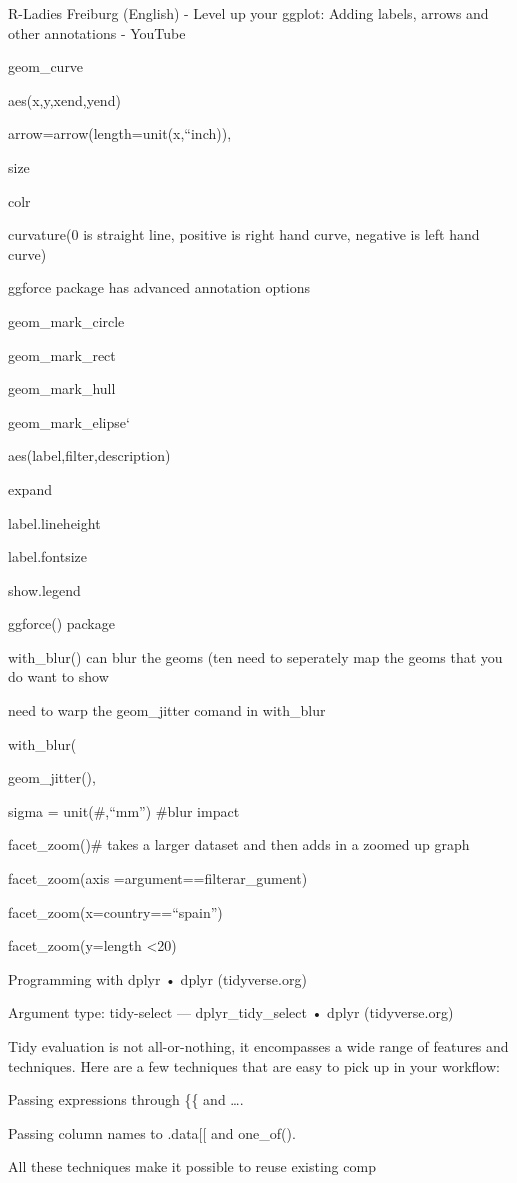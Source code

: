 \documentclass[
  letterpaper,
  DIV=11,
  numbers=noendperiod]{scrreprt}
\begin{document}
R-Ladies Freiburg (English) - Level up your ggplot: Adding labels,
arrows and other annotations - YouTube

geom\_curve

aes(x,y,xend,yend)

arrow=arrow(length=unit(x,``inch)),

size

colr

curvature(0 is straight line, positive is right hand curve, negative is
left hand curve)

ggforce package has advanced annotation options

geom\_mark\_circle

geom\_mark\_rect

geom\_mark\_hull

geom\_mark\_elipse`

aes(label,filter,description)

expand

label.lineheight

label.fontsize

show.legend

ggforce() package

with\_blur() can blur the geoms (ten need to seperately map the geoms
that you do want to show

need to warp the geom\_jitter comand in with\_blur

with\_blur(

geom\_jitter(),

sigma = unit(\#,``mm'') \#blur impact

facet\_zoom()\# takes a larger dataset and then adds in a zoomed up
graph

facet\_zoom(axis =argument==filterar\_gument)

facet\_zoom(x=country==``spain'')

facet\_zoom(y=length \textless20)

Programming with dplyr • dplyr (tidyverse.org)

Argument type: tidy-select --- dplyr\_tidy\_select • dplyr
(tidyverse.org)

Tidy evaluation is not all-or-nothing, it encompasses a wide range of
features and techniques. Here are a few techniques that are easy to pick
up in your workflow:

Passing expressions through \{\{ and \ldots.

Passing column names to .data{[}{[} and one\_of().

All these techniques make it possible to reuse existing comp
\end{document}
